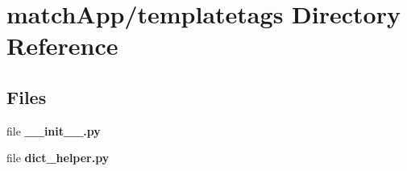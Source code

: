 \section{match\+App/templatetags Directory Reference}
\label{dir_e3d6f2f64b05bb4ed4642bcb2bdd5be5}
\subsection*{Files}
\begin{DoxyCompactItemize}
\item 
file {\bf \+\_\+\+\_\+init\+\_\+\+\_\+.\+py}
\item 
file {\bf dict\+\_\+helper.\+py}
\end{DoxyCompactItemize}
